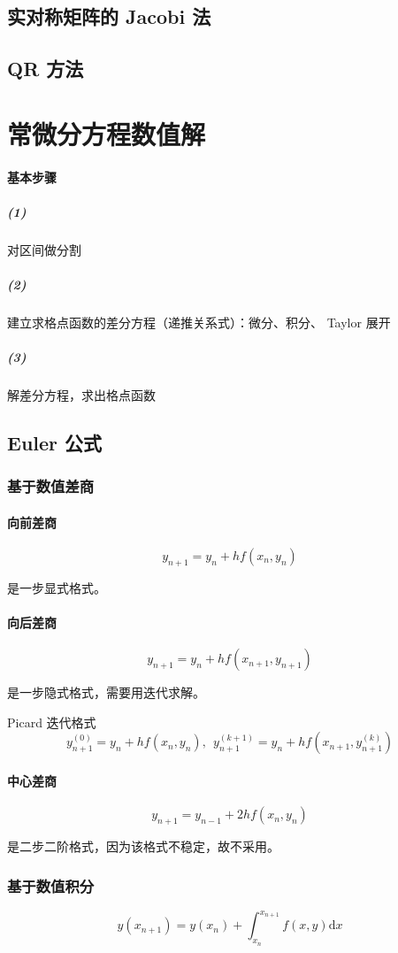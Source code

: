 \documentclass[a4paper,12pt]{article}
\begin{document}
\subsection{实对称矩阵的 Jacobi 法}

\subsection{QR 方法}

\section{常微分方程数值解}
\paragraph{基本步骤}
\subparagraph{(1)}对区间做分割
\subparagraph{(2)}建立求格点函数的差分方程（递推关系式）：微分、积分、 Taylor 展开
\subparagraph{(3)}解差分方程，求出格点函数
\subsection{Euler 公式}
\subsubsection{基于数值差商}
\paragraph{向前差商}
\[
y_{n+1}=y_n+hf(x_n,y_n)
\]\par
是一步显式格式。
\paragraph{向后差商}
\[
y_{n+1}=y_n+hf(x_{n+1},y_{n+1})
\]\par
是一步隐式格式，需要用迭代求解。\par
Picard 迭代格式\[
y^{(0)}_{n+1}=y_n+hf(x_{n},y_{n}),\ \ y^{(k+1)}_{n+1}=y_n+hf(x_{n+1},y^{(k)}_{n+1})
\]
\paragraph{中心差商}
\[
y_{n+1}=y_{n-1}+2hf(x_n,y_n)
\]\par
是二步二阶格式，因为该格式不稳定，故不采用。
\subsubsection{基于数值积分}
\[
y(x_{n+1})=y(x_n)+\int_{x_n}^{x_{n+1}}f(x,y)\mathrm{d}x
\]
\end{document}
